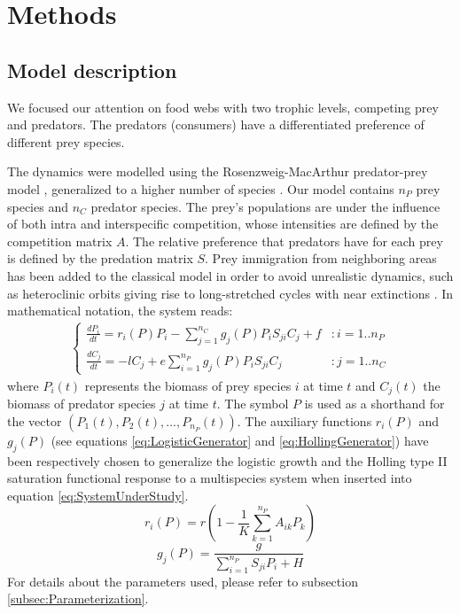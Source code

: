 \section{Methods}
\label{sec:Methods}

\subsection{Model description}
\label{subsec:Model}

We focused our attention on food webs with two trophic levels, competing prey and predators. The predators (consumers) have a differentiated preference of different prey species.

The dynamics were modelled using the Rosenzweig-MacArthur predator-prey model \citep{Rosenzweig1963}, generalized to a higher number of species \citep{Scheffer2004}. Our model contains $n_P$ prey species and $n_C$ predator species. The prey’s populations are under the influence of both intra and interspecific competition, whose intensities are defined by the competition matrix $A$. The relative preference that predators have for each prey is defined by the predation matrix $S$. Prey immigration from neighboring areas has been added to the classical model in order to avoid unrealistic dynamics, such as heteroclinic orbits giving rise to long-stretched cycles with near extinctions \citep{Scheffer2004}. In mathematical notation, the system reads:
%
\begin{eqnarray}
\label{eq:SystemUnderStudy}
	\begin{cases}
	\frac{dP_i}{dt} =  r_i(P) P_i  - \sum_{j = 1}^{n_C} g_j(P) P_i S_{ji} C_j + f & : i = 1..n_P
	\\
	\frac{dC_j}{dt} = - l C_j +  e \sum_{i = 1}^{n_P} g_j(P) P_i S_{ji} C_j  & : j = 1..n_C
	\end{cases}
\end{eqnarray}
%
where $P_i(t)$ represents the biomass of prey species $i$ at time $t$ and $C_j(t)$ the biomass of predator species $j$ at time $t$. The symbol $P$ is used as a shorthand for the vector $(P_1(t), P_2(t), ..., P_{n_P}(t))$. The auxiliary functions $r_i(P)$ and $g_j(P)$ (see equations \eqref{eq:LogisticGenerator} and \eqref{eq:HollingGenerator}) have been respectively chosen to generalize the logistic growth and the Holling type II saturation functional response \citep{Edelstein-Keshet} to a multispecies system when inserted into equation \eqref{eq:SystemUnderStudy}.
%
\begin{equation}
\label{eq:LogisticGenerator}
	r_i(P) = r \left( 1 - \frac{1}{K} \sum_{k=1}^{n_P} A_{ik} P_k \right)
\end{equation}
%
\begin{equation}
\label{eq:HollingGenerator}
	g_j(P) = \frac{g}{\sum_{i=1}^{n_P} S_{ji} P_i + H}
\end{equation}
%
For details about the parameters used, please refer to subsection \ref{subsec:Parameterization}.

